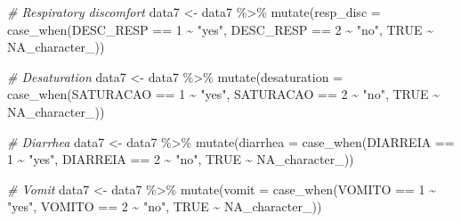 \documentclass[
]{article}
\newenvironment{Shaded}{\begin{snugshade}}{\end{snugshade}}
\newcommand{\AttributeTok}[1]{\textcolor[rgb]{0.77,0.63,0.00}{#1}}
\newcommand{\CommentTok}[1]{\textcolor[rgb]{0.56,0.35,0.01}{\textit{#1}}}
\newcommand{\ConstantTok}[1]{\textcolor[rgb]{0.00,0.00,0.00}{#1}}
\newcommand{\DecValTok}[1]{\textcolor[rgb]{0.00,0.00,0.81}{#1}}
\newcommand{\FunctionTok}[1]{\textcolor[rgb]{0.00,0.00,0.00}{#1}}
\newcommand{\NormalTok}[1]{#1}
\newcommand{\OtherTok}[1]{\textcolor[rgb]{0.56,0.35,0.01}{#1}}
\newcommand{\SpecialCharTok}[1]{\textcolor[rgb]{0.00,0.00,0.00}{#1}}
\newcommand{\StringTok}[1]{\textcolor[rgb]{0.31,0.60,0.02}{#1}}
\begin{document}
\begin{Shaded}
\begin{Highlighting}[]
\CommentTok{\# Respiratory discomfort}
\NormalTok{data7 }\OtherTok{\textless{}{-}}\NormalTok{  data7 }\SpecialCharTok{\%\textgreater{}\%}
  \FunctionTok{mutate}\NormalTok{(}\AttributeTok{resp\_disc =} \FunctionTok{case\_when}\NormalTok{(DESC\_RESP }\SpecialCharTok{==} \DecValTok{1} \SpecialCharTok{\textasciitilde{}} \StringTok{"yes"}\NormalTok{,}
\NormalTok{                               DESC\_RESP }\SpecialCharTok{==} \DecValTok{2} \SpecialCharTok{\textasciitilde{}} \StringTok{"no"}\NormalTok{,}
                               \ConstantTok{TRUE} \SpecialCharTok{\textasciitilde{}} \ConstantTok{NA\_character\_}\NormalTok{))}

\CommentTok{\# Desaturation}
\NormalTok{data7 }\OtherTok{\textless{}{-}}\NormalTok{  data7 }\SpecialCharTok{\%\textgreater{}\%}
  \FunctionTok{mutate}\NormalTok{(}\AttributeTok{desaturation =} \FunctionTok{case\_when}\NormalTok{(SATURACAO }\SpecialCharTok{==} \DecValTok{1} \SpecialCharTok{\textasciitilde{}} \StringTok{"yes"}\NormalTok{,}
\NormalTok{                                  SATURACAO }\SpecialCharTok{==} \DecValTok{2} \SpecialCharTok{\textasciitilde{}} \StringTok{"no"}\NormalTok{,}
                                  \ConstantTok{TRUE} \SpecialCharTok{\textasciitilde{}} \ConstantTok{NA\_character\_}\NormalTok{))}

\CommentTok{\# Diarrhea}
\NormalTok{data7 }\OtherTok{\textless{}{-}}\NormalTok{  data7 }\SpecialCharTok{\%\textgreater{}\%}
  \FunctionTok{mutate}\NormalTok{(}\AttributeTok{diarrhea =} \FunctionTok{case\_when}\NormalTok{(DIARREIA }\SpecialCharTok{==} \DecValTok{1} \SpecialCharTok{\textasciitilde{}} \StringTok{"yes"}\NormalTok{,}
\NormalTok{                              DIARREIA }\SpecialCharTok{==} \DecValTok{2} \SpecialCharTok{\textasciitilde{}} \StringTok{"no"}\NormalTok{,}
                              \ConstantTok{TRUE} \SpecialCharTok{\textasciitilde{}} \ConstantTok{NA\_character\_}\NormalTok{))}

\CommentTok{\# Vomit}
\NormalTok{data7 }\OtherTok{\textless{}{-}}\NormalTok{  data7 }\SpecialCharTok{\%\textgreater{}\%}
  \FunctionTok{mutate}\NormalTok{(}\AttributeTok{vomit =} \FunctionTok{case\_when}\NormalTok{(VOMITO }\SpecialCharTok{==} \DecValTok{1} \SpecialCharTok{\textasciitilde{}} \StringTok{"yes"}\NormalTok{,}
\NormalTok{                           VOMITO }\SpecialCharTok{==} \DecValTok{2} \SpecialCharTok{\textasciitilde{}} \StringTok{"no"}\NormalTok{,}
                           \ConstantTok{TRUE} \SpecialCharTok{\textasciitilde{}} \ConstantTok{NA\_character\_}\NormalTok{))}


\end{Highlighting}
\end{Shaded}
\end{document}

